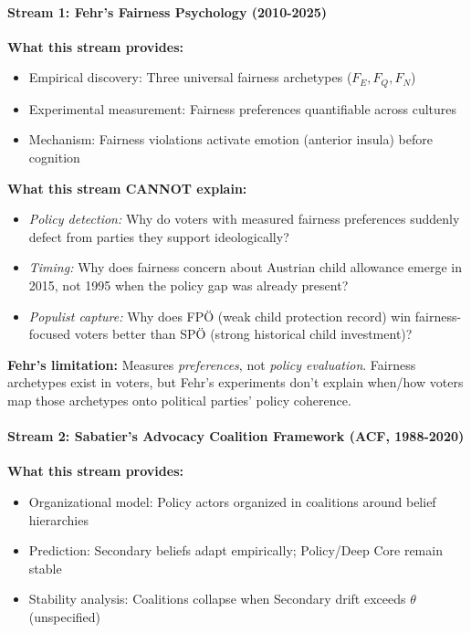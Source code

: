 \paragraph{Stream 1: Fehr's Fairness Psychology (2010-2025)}

\textbf{What this stream provides:}
\begin{itemize}[nosep]
\item Empirical discovery: Three universal fairness archetypes ($F_E, F_Q, F_N$)
\item Experimental measurement: Fairness preferences quantifiable across cultures
\item Mechanism: Fairness violations activate emotion (anterior insula) before cognition
\end{itemize}

\textbf{What this stream CANNOT explain:}
\begin{itemize}[nosep]
\item \textit{Policy detection:} Why do voters with measured fairness preferences suddenly
defect from parties they support ideologically?
\item \textit{Timing:} Why does fairness concern about Austrian child allowance emerge in 2015,
not 1995 when the policy gap was already present?
\item \textit{Populist capture:} Why does FPÖ (weak child protection record) win fairness-focused
voters better than SPÖ (strong historical child investment)?
\end{itemize}

\textbf{Fehr's limitation:} Measures \textit{preferences}, not \textit{policy evaluation}. Fairness
archetypes exist in voters, but Fehr's experiments don't explain when/how voters map those
archetypes onto political parties' policy coherence.

\paragraph{Stream 2: Sabatier's Advocacy Coalition Framework (ACF, 1988-2020)}

\textbf{What this stream provides:}
\begin{itemize}[nosep]
\item Organizational model: Policy actors organized in coalitions around belief hierarchies
\item Prediction: Secondary beliefs adapt empirically; Policy/Deep Core remain stable
\item Stability analysis: Coalitions collapse when Secondary drift exceeds $\theta$ (unspecified)
\end{itemize}


